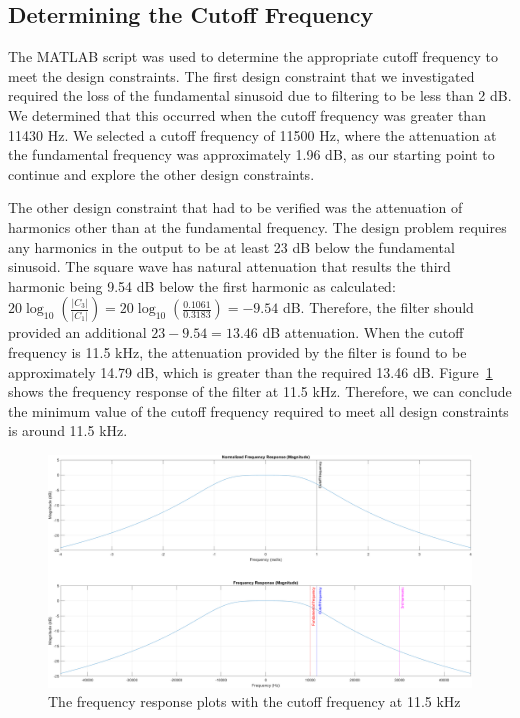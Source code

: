 \documentclass[12pt]{article}
\begin{document}
\subsection*{Determining the Cutoff Frequency}
The MATLAB script was used to determine the appropriate cutoff frequency to meet the design constraints. The first design constraint that we investigated required the loss of the fundamental sinusoid due to filtering to be less than 2 dB. We determined that this occurred when the cutoff frequency was greater than 11430 Hz. We selected a cutoff frequency of 11500 Hz, where the attenuation at the fundamental frequency was approximately 1.96 dB, as our starting point to continue and explore the other design constraints.

The other design constraint that had to be verified was the attenuation of harmonics other than at the fundamental frequency. The design problem requires any harmonics in the output to be at least 23 dB below the fundamental sinusoid. The square wave has natural attenuation that results the third harmonic being 9.54 dB below the first harmonic as calculated: $20\log_{10}\left(\frac{|C_3|}{|C_1|}\right) = 20\log_{10}\left(\frac{0.1061}{0.3183}\right) = -9.54$ dB. Therefore, the filter should provided an additional $23 - 9.54  = 13.46$ dB attenuation. When the cutoff frequency is 11.5 kHz, the attenuation provided by the filter is found to be approximately 14.79 dB, which is greater than the required 13.46 dB. Figure~\ref{fig:freq_response} shows the frequency response of the filter at 11.5 kHz. Therefore, we can conclude the minimum value of the cutoff frequency required to meet all design constraints is around 11.5 kHz.
\begin{figure}[h!]
    \includegraphics[width=\textwidth]{frequency_response.png}
    \caption{\label{fig:freq_response} The frequency response plots with the cutoff frequency at 11.5 kHz}
\end{figure}
\end{document}
